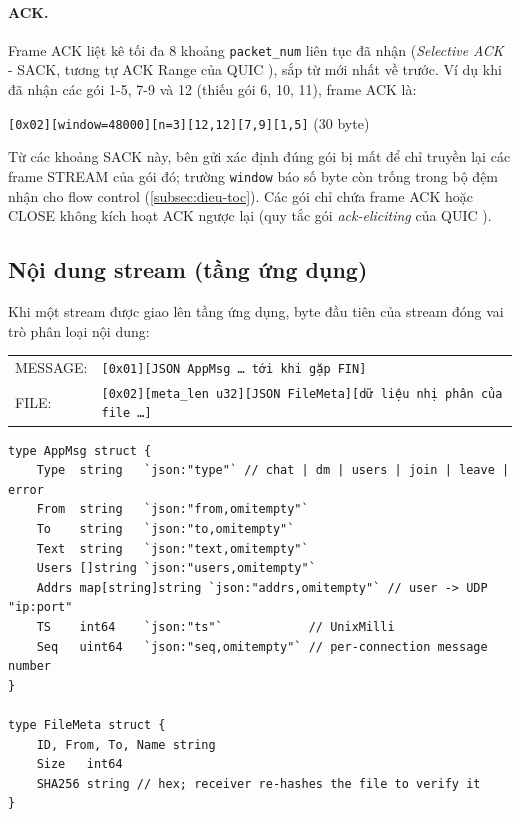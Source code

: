 \paragraph{ACK.} Frame ACK liệt kê tối đa 8 khoảng \texttt{packet\_num} liên tục đã nhận (\emph{Selective ACK} -
SACK, tương tự ACK Range của QUIC \cite{rfc9000}), sắp từ mới nhất về trước. Ví dụ khi đã nhận các gói 1-5, 7-9
và 12 (thiếu gói 6, 10, 11), frame ACK là:
\begin{center}
  \texttt{[0x02][window=48000][n=3][12,12][7,9][1,5]} \quad (30 byte)
\end{center}
Từ các khoảng SACK này, bên gửi xác định đúng gói bị mất để chỉ truyền lại các frame STREAM của gói đó; trường
\texttt{window} báo số byte còn trống trong bộ đệm nhận cho flow control (\cref{subsec:dieu-toc}). Các
gói chỉ chứa frame ACK hoặc CLOSE không kích hoạt ACK ngược lại (quy tắc gói \emph{ack-eliciting} của QUIC
\cite{rfc9000}).

\subsection{Nội dung stream (tầng ứng dụng)}
\label{subsec:app}
Khi một stream được giao lên tầng ứng dụng, byte đầu tiên của stream đóng vai trò phân loại nội dung:
\begin{center}
  \small
  \begin{tabular}{ll}
    MESSAGE: & \texttt{[0x01][JSON AppMsg \dots{} tới khi gặp FIN]} \\
    FILE: & \texttt{[0x02][meta\_len u32][JSON FileMeta][dữ liệu nhị phân của file \dots]}
  \end{tabular}
\end{center}

\begin{lstlisting}[caption={Cấu trúc nội dung tầng ứng dụng (\fname{appmsg.go}, rút gọn)},
  label=lst:appmsg]
type AppMsg struct {
	Type  string   `json:"type"` // chat | dm | users | join | leave | error
	From  string   `json:"from,omitempty"`
	To    string   `json:"to,omitempty"`
	Text  string   `json:"text,omitempty"`
	Users []string `json:"users,omitempty"`
	Addrs map[string]string `json:"addrs,omitempty"` // user -> UDP "ip:port"
	TS    int64    `json:"ts"`            // UnixMilli
	Seq   uint64   `json:"seq,omitempty"` // per-connection message number
}

type FileMeta struct {
	ID, From, To, Name string
	Size   int64
	SHA256 string // hex; receiver re-hashes the file to verify it
}
\end{lstlisting}

